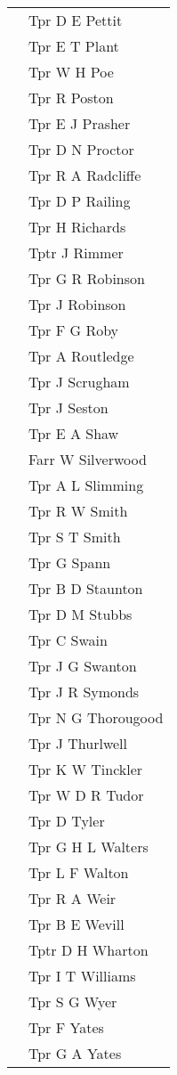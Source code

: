 \begin{center}
\begin{tabular}{rl}
    & Tpr D E Pettit \\
    & Tpr E T Plant \\
    & Tpr W H Poe \\
    & Tpr R Poston \\
    & Tpr E J Prasher \\
    & Tpr D N Proctor \\
    & Tpr R A Radcliffe \\
    & Tpr D P Railing \\
    & Tpr H Richards \\
    & Tptr J Rimmer \\
    & Tpr G R Robinson \\
    & Tpr J Robinson \\
    & Tpr F G Roby \\
    & Tpr A Routledge \\
    & Tpr J Scrugham \\
    & Tpr J Seston \\
    & Tpr E A Shaw \\
    & Farr W Silverwood \\
    & Tpr A L Slimming \\
    & Tpr R W Smith \\
    & Tpr S T Smith \\
    & Tpr G Spann \\
    & Tpr B D Staunton \\
    & Tpr D M Stubbs \\
    & Tpr C Swain \\
    & Tpr J G Swanton \\
    & Tpr J R Symonds \\
    & Tpr N G Thorougood \\
    & Tpr J Thurlwell \\
    & Tpr K W Tinckler \\
    & Tpr W D R Tudor \\
    & Tpr D Tyler \\
    & Tpr G H L Walters \\
    & Tpr L F Walton \\
    & Tpr R A Weir \\
    & Tpr B E Wevill \\
    & Tptr D H Wharton \\
    & Tpr I T Williams \\
    & Tpr S G Wyer \\
    & Tpr F Yates \\
    & Tpr G A Yates \\
  \end{tabular}
\end{center}


